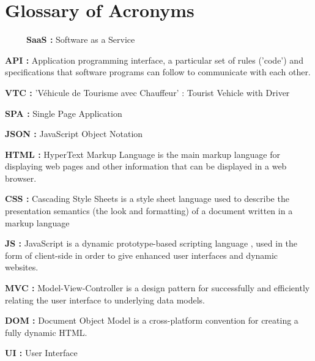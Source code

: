 \chapter*{Glossary of Acronyms}


~~~~~\textbf{SaaS : } Software as a Service

\textbf{API : } Application programming interface, a particular set of rules (’code’) and specifications that software programs can follow to communicate with each other.

\textbf{VTC : } 'Véhicule de Tourisme avec Chauffeur' : Tourist Vehicle with Driver

\textbf{SPA : } Single Page Application

\textbf{JSON : }JavaScript Object Notation

\textbf{HTML : } HyperText Markup Language is the main markup language for displaying web pages and other information that can be displayed in a web browser.

\textbf{CSS : }Cascading Style Sheets is a style sheet language used to describe the presentation semantics (the look and formatting) of a document written in a markup language

\textbf{JS : } JavaScript is a dynamic prototype-based scripting language , used in the form of client-side in order to give enhanced user interfaces and dynamic websites.

\textbf{MVC : } Model-View-Controller is a design pattern for successfully and efficiently relating the user interface to underlying data models. 

\textbf{DOM : } Document Object Model is a cross-platform convention for creating a fully dynamic HTML.

\textbf{UI : } User Interface